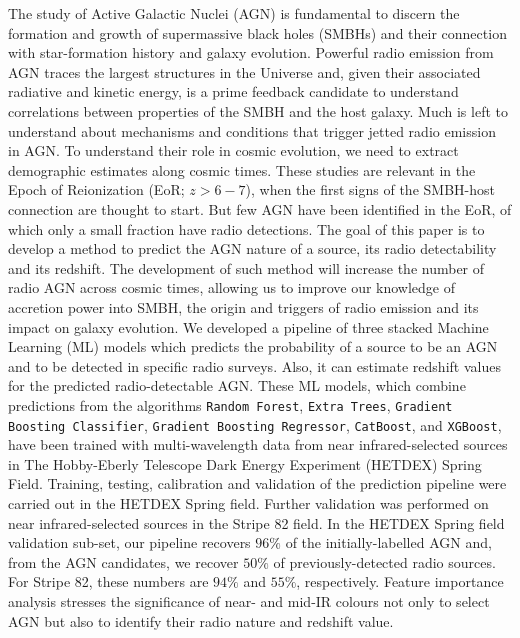 \documentclass{aa}
\begin{document}
   \date{Received ; accepted }

 
  \abstract
   {The study of Active Galactic Nuclei (AGN) is fundamental to discern the formation and growth of supermassive black holes (SMBHs) and their connection with star-formation history and galaxy evolution. Powerful radio emission from AGN traces the largest structures in the Universe and, given their associated radiative and kinetic energy, is a prime feedback candidate to understand correlations between properties of the SMBH and the host galaxy. Much is left to understand about mechanisms and conditions that trigger jetted radio emission in AGN. To understand their role in cosmic evolution, we need to extract demographic estimates along cosmic times. These studies are relevant in the Epoch of Reionization (EoR; ${z{>}6-7}$), when the first signs of the SMBH-host connection are thought to start. But few AGN have been identified in the EoR, of which only a small fraction have radio detections.
   }
   {The goal of this paper is to develop a method to predict the AGN nature of a source, its radio detectability and its redshift. The development of such method will increase the number of radio AGN across cosmic times, allowing us to improve our knowledge of accretion power into SMBH, the origin and triggers of radio emission and its impact on galaxy evolution.   
   }
   {We developed a pipeline of three stacked Machine Learning (ML) models which predicts the probability of a source to be an AGN and to be detected in specific radio surveys. Also, it can estimate redshift values for the predicted radio-detectable AGN. These ML models, which combine predictions from the algorithms \texttt{Random Forest}, \texttt{Extra Trees}, \texttt{Gradient Boosting Classifier}, \texttt{Gradient Boosting Regressor}, \texttt{CatBoost}, and \texttt{XGBoost}, have been trained with multi-wavelength data from near infrared-selected sources in The Hobby-Eberly Telescope Dark Energy Experiment (HETDEX) Spring Field. Training, testing, calibration and validation of the prediction pipeline were carried out in the HETDEX Spring field. Further validation was performed on near infrared-selected sources in the Stripe 82 field.
   }
   {In the HETDEX Spring field validation sub-set, our pipeline recovers $96\%$ of the initially-labelled AGN and, from the AGN candidates, we recover $50\%$ of previously-detected radio sources. For Stripe 82, these numbers are $94\%$ and $55\%$, respectively. Feature importance analysis stresses the significance of near- and mid-IR colours not only to select AGN but also to identify their radio nature and redshift value.
   }
\end{document}
